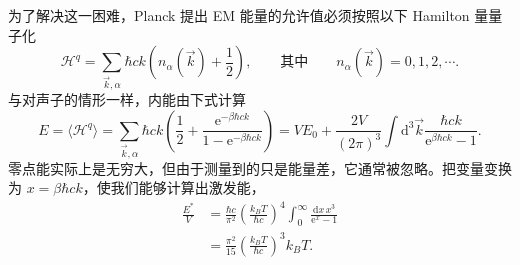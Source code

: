 
为了解决这一困难，Planck 提出 EM 能量的允许值必须按照以下 Hamilton 量量子化
\begin{equation}\label{eq:6.50}
\mathscr H^q=\sum_{\vec k,\alpha}\hbar ck\left(n_\alpha(\vec k)+\frac12\right),\qquad\text{其中}\qquad n_\alpha(\vec k)=0,1,2,\cdots.
\end{equation}
与对声子的情形一样，内能由下式计算
\begin{equation}\label{eq:6.51}
E=\langle\mathscr H^q\rangle=\sum_{\vec k,\alpha}\hbar ck\left(\frac12+\frac{\mathrm e^{-\beta\hbar ck}}{1-\mathrm e^{-\beta\hbar ck}}\right)=VE_0+\frac{2V}{(2\pi)^3}\int\mathrm d^3\vec k\frac{\hbar ck}{\mathrm e^{\beta\hbar ck}-1}.
\end{equation}
零点能实际上是无穷大，但由于测量到的只是能量差，它通常被忽略。把变量变换为 $x=\beta\hbar ck$，使我们能够计算出激发能，
\begin{equation}\label{eq:6.52}
\begin{aligned}
\frac{E^*}{V}&=\frac{\hbar c}{\pi^2}\left(\frac{k_BT}{\hbar c}\right)^4\int_0^\infty\frac{\mathrm dx\,x^3}{\mathrm e^x-1}\\
&=\frac{\pi^2}{15}\left(\frac{k_BT}{\hbar c}\right)^3k_BT.
\end{aligned}
\end{equation}

